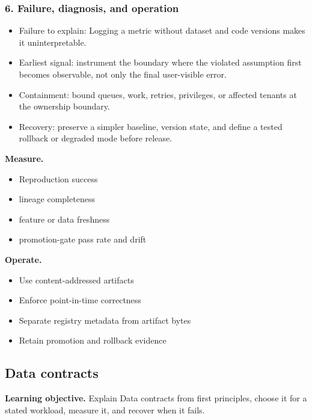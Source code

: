\subsubsection*{6. Failure, diagnosis, and operation}
\begin{itemize}
\item Failure to explain: Logging a metric without dataset and code versions makes it uninterpretable.
\item Earliest signal: instrument the boundary where the violated assumption first becomes observable, not only the final user-visible error.
\item Containment: bound queues, work, retries, privileges, or affected tenants at the ownership boundary.
\item Recovery: preserve a simpler baseline, version state, and define a tested rollback or degraded mode before release.
\end{itemize}
\textbf{Measure.}\begin{itemize}
\item Reproduction success
\item lineage completeness
\item feature or data freshness
\item promotion-gate pass rate and drift
\end{itemize}
\textbf{Operate.}\begin{itemize}
\item Use content-addressed artifacts
\item Enforce point-in-time correctness
\item Separate registry metadata from artifact bytes
\item Retain promotion and rollback evidence
\end{itemize}
\subsection{Data contracts}
\textbf{Learning objective.} Explain Data contracts from first principles, choose it for a stated workload, measure it, and recover when it fails.
